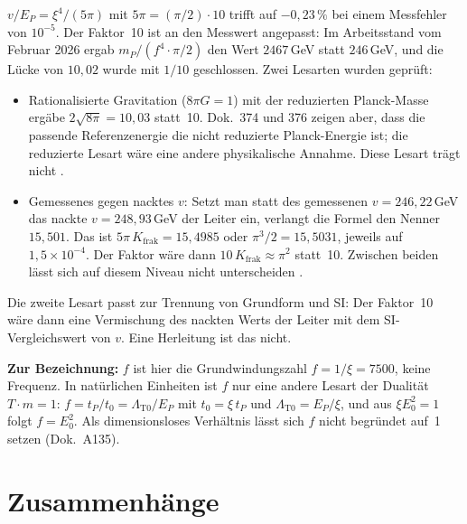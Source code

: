 $v/E_P=\xi^4/(5\pi)$ mit $5\pi=(\pi/2)\cdot10$ trifft auf $-0{,}23\,\%$ bei einem Messfehler von
$10^{-5}$. Der Faktor~10 ist an den Messwert angepasst: Im Arbeitsstand vom Februar 2026 ergab
$m_P/(f^4\cdot\pi/2)$ den Wert $2467$\,GeV statt $246$\,GeV, und die Lücke von $10{,}02$ wurde mit
$1/10$ geschlossen. Zwei Lesarten wurden geprüft:
\begin{itemize}[leftmargin=*,itemsep=1pt]
\item Rationalisierte Gravitation ($8\pi G=1$) mit der reduzierten Planck-Masse ergäbe
  $2\sqrt{8\pi}=10{,}03$ statt~10. Dok.~374 und 376 zeigen aber, dass die passende
  Referenzenergie die nicht reduzierte Planck-Energie ist; die reduzierte Lesart wäre eine andere
  physikalische Annahme. Diese Lesart trägt nicht \XM.
\item Gemessenes gegen nacktes $v$: Setzt man statt des gemessenen $v=246{,}22$\,GeV das nackte
  $v=248{,}93$\,GeV der Leiter ein, verlangt die Formel den Nenner $15{,}501$. Das ist
  $5\pi\,K_{\text{frak}}=15{,}4985$ oder $\pi^3/2=15{,}5031$, jeweils auf $1{,}5\times10^{-4}$. Der
  Faktor wäre dann $10\,K_{\text{frak}}\approx\pi^2$ statt~10. Zwischen beiden lässt sich auf
  diesem Niveau nicht unterscheiden \SM.
\end{itemize}
Die zweite Lesart passt zur Trennung von Grundform und SI: Der Faktor~10 wäre dann eine
Vermischung des nackten Werts der Leiter mit dem SI-Vergleichswert von $v$. Eine Herleitung ist
das nicht.

\noindent\textbf{Zur Bezeichnung:} $f$ ist hier die Grundwindungszahl $f = 1/\xi = 7500$, keine Frequenz. In natürlichen Einheiten ist $f$ nur eine andere Lesart der Dualität $T\cdot m = 1$: $f = t_P/t_0 = \Lambda_{\text{T0}}/E_P$ mit $t_0 = \xi\,t_P$ und $\Lambda_{\text{T0}} = E_P/\xi$, und aus $\xi E_0^2 = 1$ folgt $f = E_0^2$. Als dimensionsloses Verhältnis lässt sich $f$ nicht begründet auf~1 setzen (Dok.~A135).

\section{Zusammenhänge}

